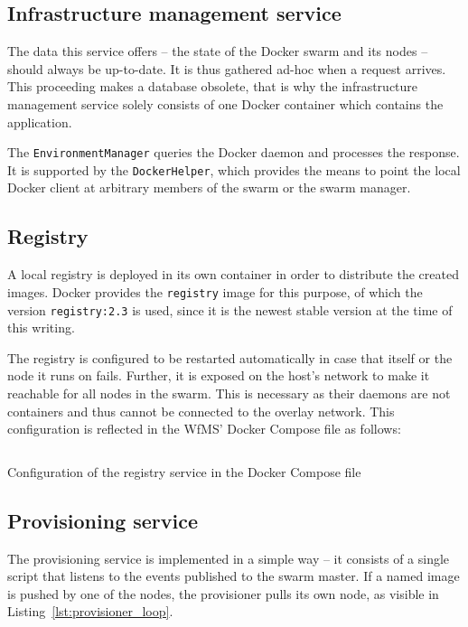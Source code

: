   \subsection{Infrastructure management service} %
    \label{sub:infrastructure_management_service}
      The data this service offers -- the state of the Docker swarm and its nodes -- should always be up-to-date. It is thus gathered ad-hoc when a request arrives. This proceeding makes a database obsolete, that is why the infrastructure management service solely consists of one Docker container which contains the application.

      The \texttt{EnvironmentManager} queries the Docker daemon and processes the response. It is supported by the \texttt{DockerHelper}, which provides the means to point the local Docker client at arbitrary members of the swarm or the swarm manager.

  \subsection{Registry} %
    \label{sub:registry}
    A local registry is deployed in its own container in order to distribute the created images.
    Docker provides the \texttt{registry} image for this purpose, of which the version \texttt{registry:2.3} is used, since it is the newest stable version at the time of this writing.

    The registry is configured to be restarted automatically in case that itself or the node it runs on fails. Further, it is exposed on the host's network to make it reachable for all nodes in the swarm. This is necessary as their daemons are not containers and thus cannot be connected to the overlay network. This configuration is reflected in the \ac{WfMS}' Docker Compose file as follows:

    \begin{listing}[!htbp]
      \inputminted[firstline=12,lastline=21,fontsize=\footnotesize,linenos=true,numberblanklines=true,showspaces=false,breaklines=true,baselinestretch=1]{yaml}{../code/wfms.yml}
      \caption{Configuration of the registry service in the Docker Compose file}
      \label{lst:configuration_of_the_registry_service_in_the_docker_compose_file}
    \end{listing}

  \subsection{Provisioning service} %
    \label{sub:provisioning_service}
      The provisioning service is implemented in a simple way -- it consists of a single script that listens to the events published to the swarm master. If a named image is pushed by one of the nodes, the provisioner pulls its own node, as visible in Listing~\ref{lst:provisioner_loop}.

